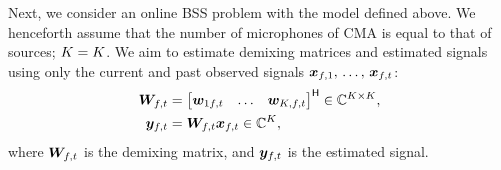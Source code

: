 \documentclass[sip,biber]{now-journal}
\begin{document}
Next, we consider an online BSS problem with the model defined above.
We henceforth assume that the number of microphones of CMA is equal to that of sources; $\Mic = \Src$.
\renewcommand{\Mic}{\Src}%
We aim to estimate demixing matrices and estimated signals using only the current and past observed signals $\bm{x} _{f,1},\, \dots,\, \bm{x} _{f,t}$:
\begin{align}
  \Demix _{\ft} &= \begin{bmatrix} \demix _{1\ft} & \dots & \demix _{\Src,\ft} \end{bmatrix} ^{\hermite} \in \C ^{\Src \times \Mic}, \\
  \Est _{\ft} &= \Demix _{\ft} \Obs _{\ft} \in \C ^{\Src},
\end{align}
where $\Demix _{\ft}$ is the demixing matrix, and $\Est _{\ft}$ is the estimated signal.
\end{document}
